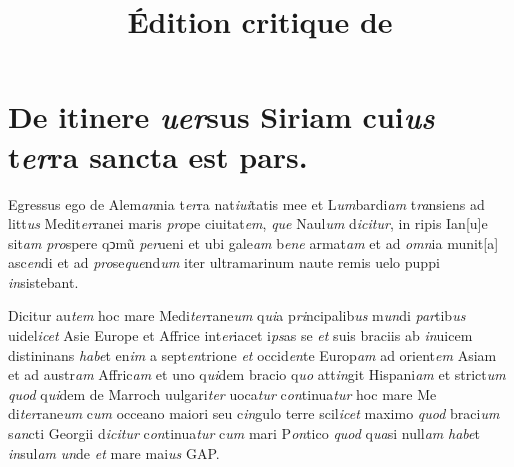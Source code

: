 \documentclass[12pt, a4paper]{book}
\newcommand{\styleabbr}[1]{\textit{#1}}
\begin{document}
			\title{Édition critique de}
			\maketitle
		
			\beginnumbering
			
	
	
	
		
			
				
			
			
				\chapter{
					De itinere \styleabbr{uer}sus Siriam cui\styleabbr{us} t\styleabbr{er}ra sancta est pars.
				}
				
	\pstart
	
					Egressus ego de Alem\styleabbr{an}nia t\styleabbr{er}ra nat\styleabbr{iui}tatis mee
					et L\styleabbr{um}bardi\styleabbr{am} t\styleabbr{ra}nsiens ad litt\styleabbr{us} Medit\styleabbr{er}ranei maris
					\styleabbr{pro}pe ciuitat\styleabbr{em}, \styleabbr{que} Naul\styleabbr{um} d\styleabbr{icitur},
					in ripis Ian[u]e sit\styleabbr{am} \styleabbr{pro}spere qↄmũ \styleabbr{per}ueni et ubi gale\styleabbr{am} 
					b\styleabbr{ene} armat\styleabbr{am} et ad \styleabbr{omn}ia munit[a] asc\styleabbr{en}di
					et ad \styleabbr{pro}se\styleabbr{que}nd\styleabbr{um} iter ultramarinum
					naute remis uelo puppi \styleabbr{in}sistebant.
				
	\pend
	
				
	\pstart
	
					Dicitur au\styleabbr{tem} hoc mare Medi\styleabbr{ter}rane\styleabbr{um}
					q\styleabbr{ui}a p\styleabbr{ri}ncipalib\styleabbr{us} m\styleabbr{un}di \styleabbr{par}tib\styleabbr{us} uidel\styleabbr{icet} Asie Europe et Affrice int\styleabbr{er}iacet i\styleabbr{ps}as se \styleabbr{et}
					suis braciis ab \styleabbr{in}uicem distininans \styleabbr{habe}t en\styleabbr{im} a sept\styleabbr{en}trione \styleabbr{et} occid\styleabbr{en}te Europ\styleabbr{am}
					ad orient\styleabbr{em} Asiam et ad austr\styleabbr{am} Affric\styleabbr{am} et uno q\styleabbr{ui}dem bracio q\styleabbr{uo} att\styleabbr{in}git Hispani\styleabbr{am}
					et strict\styleabbr{um} \styleabbr{quod} q\styleabbr{ui}dem de Marroch uulgari\styleabbr{ter} uoca\styleabbr{tur} c\styleabbr{on}tinua\styleabbr{tur} hoc mare Me
					di\styleabbr{ter}rane\styleabbr{um} c\styleabbr{um} occeano maiori seu c\styleabbr{in}gulo terre scil\styleabbr{icet} maximo \styleabbr{quod} braci\styleabbr{um} s\styleabbr{an}cti
					Georgii d\styleabbr{icitur} c\styleabbr{on}tinua\styleabbr{tur} c\styleabbr{um} mari P\styleabbr{on}tico \styleabbr{quod} q\styleabbr{ua}si null\styleabbr{am} \styleabbr{habe}t \styleabbr{in}sul\styleabbr{am} \styleabbr{un}de \styleabbr{et} mare mai\styleabbr{us} GAP.
				
\end{document}
